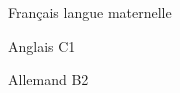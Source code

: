 

\begin{cvpairs}

  
\cvpair
    {Français} %
    {langue maternelle} %


\cvpair
    {Anglais} %
    {C1} %


\cvpair
    {Allemand} %
    {B2} %

\end{cvpairs}